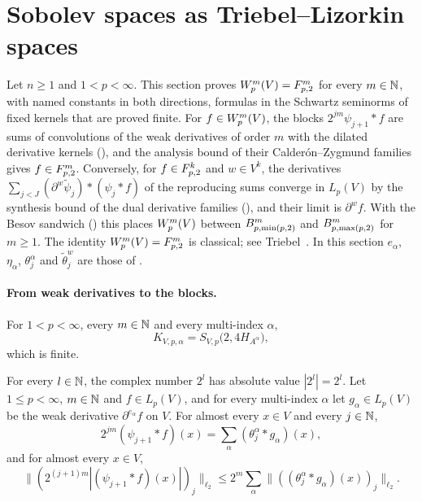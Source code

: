 \section{Sobolev spaces as Triebel--Lizorkin spaces}
\label{sec:sobolev-triebel-lizorkin}

Let $n \geq 1$ and $1 < p < \infty$. This section proves $W^{m}_{p}(V) = F^{m}_{p,2}$ for every
$m \in \mathbb{N}$, with named constants in both directions, formulas in the Schwartz seminorms of fixed
kernels that are proved finite. For $f \in W^{m}_{p}(V)$, the blocks
$2^{jm} \psi_{j+1} * f$ are sums of convolutions of the weak derivatives of order $m$ with the
dilated derivative kernels (), and the analysis bound of their
Calder\'on--Zygmund families gives $f \in F^{m}_{p,2}$. Conversely, for $f \in F^{k}_{p,2}$ and
$w \in V^k$, the derivatives $\sum_{j < J} (\partial^w \tilde\psi_j) * (\psi_j * f)$
of the reproducing sums converge in $L_p(V)$ by the synthesis bound of the dual derivative
families (), and their limit is $\partial^w f$. With the
Besov sandwich () this places $W^{m}_{p}(V)$ between
$B^{m}_{p,\min(p,2)}$ and $B^{m}_{p,\max(p,2)}$ for $m \geq 1$. The identity
$W^{m}_{p}(V) = F^{m}_{p,2}$ is classical; see Triebel~\cite{Triebel}. In this section
$e_\alpha$, $\eta_\alpha$, $\theta^\alpha_j$ and $\tilde\theta^w_j$ are those of
.

\paragraph{From weak derivatives to the blocks.}

\begin{definition}
\label{def:sobolev-to-tl-const}
\leanok
{}
For $1 < p < \infty$, every $m \in \mathbb{N}$ and every multi-index $\alpha$,
\[
  K_{V,p,\alpha} = S_{V,p}\bigl(2, 4 H_{A^\alpha}\bigr) ,
\]
which is finite.
\end{definition}

\begin{lemma}
\label{lem:blocks-as-derivative-convolutions}
\leanok
{}
For every $l \in \mathbb{N}$, the complex number $2^l$ has absolute value $|2^l| = 2^l$.
Let $1 \leq p < \infty$, $m \in \mathbb{N}$ and $f \in L_p(V)$, and for every multi-index $\alpha$ let
$g_\alpha \in L_p(V)$ be the weak derivative $\partial^{e_\alpha} f$ on $V$. For almost every
$x \in V$ and every $j \in \mathbb{N}$,
\[
  2^{jm} (\psi_{j+1} * f)(x) = \sum_\alpha (\theta^\alpha_j * g_\alpha)(x) ,
\]
and for almost every $x \in V$,
\[
  \bigl\| (2^{(j+1)m} |(\psi_{j+1} * f)(x)|)_j \bigr\|_{\ell_2}
  \leq 2^m \sum_\alpha \bigl\| ((\theta^\alpha_j * g_\alpha)(x))_j \bigr\|_{\ell_2} .
\]
\end{lemma}

